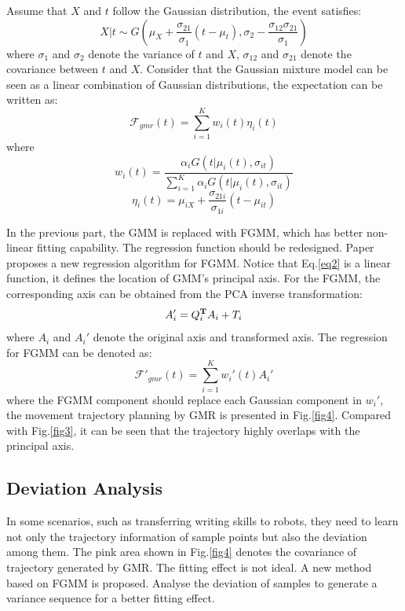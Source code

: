\documentclass[conference]{IEEEtran}
\begin{document}
Assume that $X$ and $t$ follow the Gaussian distribution, the event satisfies:
\begin{equation}
    X|t \sim G(\mu_X+\frac{\sigma_{21}}{\sigma_{1}}(t-\mu_t),\sigma_{2}-\frac{\sigma_{12}\sigma_{21}}{\sigma_{1}})
\end{equation}
where $\sigma_{1}$ and $\sigma_{2}$ denote the variance of $t$ and $X$, $\sigma_{12}$ and $\sigma_{21}$ denote the covariance between $t$ and $X$. Consider that the Gaussian mixture model can be seen as a linear combination of Gaussian distributions, the expectation can be written as:
\begin{equation}
    \mathcal{F} _{gmr}(t)=\sum\limits_{i=1}^{K}w_i(t)\eta_i(t)
\end{equation}
where
\begin{equation}
    w_i(t)=\frac{\alpha_{i}G(t|\mu_{i}(t),\sigma_{it})}{\sum_{i=1}^{K}\alpha_{i}G(t|\mu_{i}(t),\sigma_{it})}
\end{equation}
\begin{equation}
    \eta_i(t)=\mu_{iX}+\frac{\sigma_{21i}}{\sigma_{1i}}(t-\mu_{it})
    \label{eq2}
\end{equation}

In the previous part, the GMM is replaced with FGMM, which has better non-linear fitting capability. The regression function should be redesigned. Paper\cite{Yang2019c} proposes a new regression algorithm for FGMM. Notice that Eq.\ref{eq2} is a linear function, it defines the location of GMM's principal axis. For the FGMM, the corresponding axis can be obtained from the PCA inverse transformation:
\begin{equation}
    A_i'=Q_i^{\bf{T}}A_i+T_i
\end{equation}
where $A_i$ and $A_i'$ denote the original axis and transformed axis. The regression for FGMM can be denoted as:
\begin{equation}
    \mathcal{F}' _{gmr}(t)=\sum\limits_{i=1}^{K}w_i'(t)A_i'
\end{equation}
where the FGMM component should replace each Gaussian component in $w_i'$, the movement trajectory planning by GMR is presented in Fig.\ref{fig4}. Compared with Fig.\ref{fig3}, it can be seen that the trajectory highly overlaps with the principal axis.

\subsection{Deviation Analysis}
In some scenarios, such as transferring writing skills to robots, they need to learn not only the trajectory information of sample points but also the deviation among them. The pink area shown in Fig.\ref{fig4} denotes the covariance of trajectory generated by GMR. The fitting effect is not ideal. A new method based on FGMM is proposed. Analyse the deviation of samples to generate a variance sequence for a better fitting effect.
\end{document}
